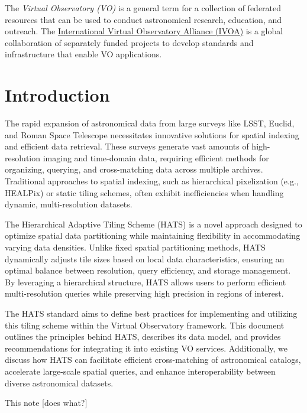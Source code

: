 \documentclass[11pt,a4paper]{ivoa}
\begin{document}
The \emph{Virtual Observatory (VO)} is a
general term for a collection of federated resources that can be used
to conduct astronomical research, education, and outreach.
The \href{https://www.ivoa.net}{International
Virtual Observatory Alliance (IVOA)} is a global
collaboration of separately funded projects to develop standards and
infrastructure that enable VO applications.

\section{Introduction}
    The rapid expansion of astronomical data from large surveys like LSST, Euclid, and Roman Space Telescope necessitates innovative solutions for spatial indexing and efficient data retrieval. These surveys generate vast amounts of high-resolution imaging and time-domain data, requiring efficient methods for organizing, querying, and cross-matching data across multiple archives. Traditional approaches to spatial indexing, such as hierarchical pixelization (e.g., HEALPix) or static tiling schemes, often exhibit inefficiencies when handling dynamic, multi-resolution datasets.

    The Hierarchical Adaptive Tiling Scheme (HATS) is a novel approach designed to optimize spatial data partitioning while maintaining flexibility in accommodating varying data densities. Unlike fixed spatial partitioning methods, HATS dynamically adjusts tile sizes based on local data characteristics, ensuring an optimal balance between resolution, query efficiency, and storage management. By leveraging a hierarchical structure, HATS allows users to perform efficient multi-resolution queries while preserving high precision in regions of interest.

    The HATS standard aims to define best practices for implementing and utilizing this tiling scheme within the Virtual Observatory framework. This document outlines the principles behind HATS, describes its data model, and provides recommendations for integrating it into existing VO services. Additionally, we discuss how HATS can facilitate efficient cross-matching of astronomical catalogs, accelerate large-scale spatial queries, and enhance interoperability between diverse astronomical datasets.
    
    This note [does what?]
\end{document}

